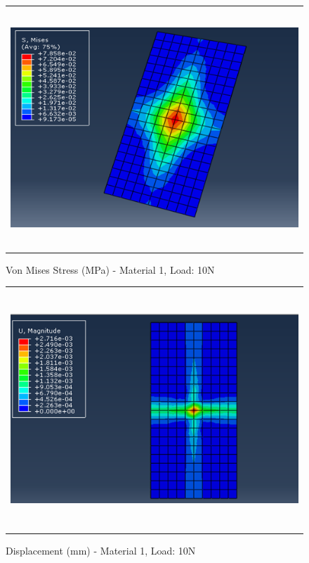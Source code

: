 \documentclass[a4paper,12pt]{article}
\numberwithin{equation}{section}
\numberwithin{figure}{section}
\begin{document}
\begin{figure}[H]
  \centering
  \begin{tabular}{@{}c@{}}
    \includegraphics[width=0.7\linewidth,height=255pt]{Results/Point Loading/M1_VMS_L2.png} \\
  \end{tabular}
  \caption{Von Mises Stress (MPa) - Material 1, Load: 10N}
\end{figure}

\begin{figure}[H]
  \centering
  \begin{tabular}{@{}c@{}}
    \includegraphics[width=0.7\linewidth,height=255pt]{Results/Point Loading/M1_DIS_L2.png} \\
  \end{tabular}
  \caption{Displacement (mm) - Material 1, Load: 10N}
\end{figure}
\end{document}
